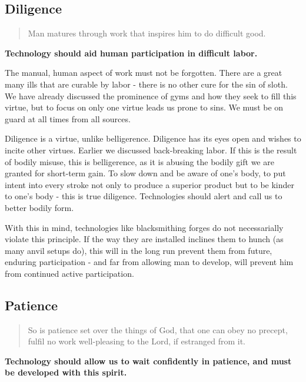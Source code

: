 \documentclass[letterpaper]{article}
\begin{document}
\subsection{Diligence}

\begin{quote}
  Man matures through work that inspires him to do difficult good.
\end{quote}

\textbf{Technology should aid human participation in difficult labor.}

The manual, human aspect of work must not be forgotten. There are a great many ills that are curable by labor - there is no other cure for the sin of sloth. We have already discussed the prominence of gyms and how they seek to fill this virtue, but to focus on only one virtue leads us prone to sins. We must be on guard at all times from all sources.

Diligence is a virtue, unlike belligerence. Diligence has its eyes open and wishes to incite other virtues. Earlier we discussed back-breaking labor. If this is the result of bodily misuse, this is belligerence, as it is abusing the bodily gift we are granted for short-term gain. To slow down and be aware of one's body, to put intent into every stroke not only to produce a superior product but to be kinder to one's body - this is true diligence. Technologies should alert and call us to better bodily form.

With this in mind, technologies like blacksmithing forges do not necessarially violate this principle. If the way they are installed inclines them to hunch (as many anvil setups do), this will in the long run prevent them from future, enduring participation - and far from allowing man to develop, will prevent him from continued active participation.


\subsection{Patience}

\begin{quote}
  So is patience set over the things of God, that one can obey no precept, fulfil no work well-pleasing to the Lord, if estranged from it.
\end{quote}

\textbf{Technology should allow us to wait confidently in patience, and must be developed with this spirit.}
\end{document}
